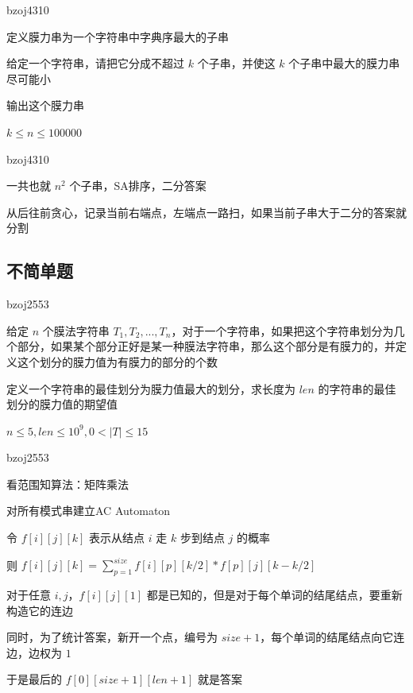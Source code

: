 \documentclass[UTF8]{beamer}
\begin{document}
			\begin{frame}{bzoj4310}

			定义膜力串为一个字符串中字典序最大的子串

			给定一个字符串，请把它分成不超过 $k$ 个子串，并使这 $k$ 个子串中最大的膜力串尽可能小

			输出这个膜力串

			$k \le n \le 100000$

			\end{frame}

			\begin{frame}{bzoj4310}

			一共也就 $n^2$ 个子串，SA排序，二分答案

			从后往前贪心，记录当前右端点，左端点一路扫，如果当前子串大于二分的答案就分割

			\end{frame}

		\subsection{不简单题}

			\begin{frame}{bzoj2553}

			给定 $n$ 个膜法字符串 $T_1, T_2, ..., T_n$，对于一个字符串，如果把这个字符串划分为几个部分，如果某个部分正好是某一种膜法字符串，那么这个部分是有膜力的，并定义这个划分的膜力值为有膜力的部分的个数

			定义一个字符串的最佳划分为膜力值最大的划分，求长度为 $len$ 的字符串的最佳划分的膜力值的期望值

			$n \le 5, len \le 10^9, 0 < |T| \le 15$

			\end{frame}

			\begin{frame}{bzoj2553}

			看范围知算法：矩阵乘法

			对所有模式串建立AC Automaton

			令 $f[i][j][k]$ 表示从结点 $i$ 走 $k$ 步到结点 $j$ 的概率

			则 $f[i][j][k] = \sum _{p=1}^{size} f[i][p][k/2] * f[p][j][k-k/2]$

			对于任意 $i,j$，$f[i][j][1]$ 都是已知的，但是对于每个单词的结尾结点，要重新构造它的连边

			同时，为了统计答案，新开一个点，编号为 $size+1$，每个单词的结尾结点向它连边，边权为 $1$

			于是最后的 $f[0][size+1][len+1]$ 就是答案

			\end{frame}
\end{document}
